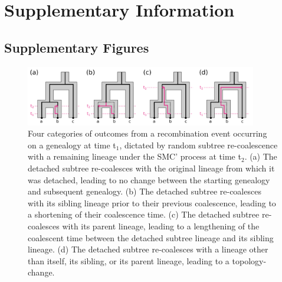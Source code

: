 \documentclass[11pt]{article}
\newcommand{\beginsupplement}{%
	\setcounter{table}{0}
	\setcounter{figure}{0}
	\renewcommand{\thetable}{S\arabic{table}}%
	\renewcommand{\thefigure}{S\arabic{figure}}%
}
\begin{document}
\newpage

\beginsupplement
\section{Supplementary Information}

\setcounter{equation}{0}
\renewcommand{\theequation}{S\arabic{equation}}

\subsection{Supplementary Figures}

\begin{figure}[p]
	\centering
	\includegraphics[width=0.9\textwidth]{figures/current/FigS1-recomb-types.pdf}
	\caption{
		Four categories of outcomes from a recombination event occurring on a
		genealogy at time t$_1$, dictated by random subtree re-coalescence with
		a remaining lineage under the SMC' process at time t$_2$. (a) The
		detached subtree re-coalesces with the original lineage from which it
		was detached, leading to no change between the starting genealogy and 
		subsequent genealogy. (b) The detached subtree re-coalesces with its
		sibling lineage prior to their previous coalescence, leading to a shortening
		of their coalescence time. (c) The detached subtree re-coalesces with
		its parent lineage, leading to a lengthening of the coalescent time 
		between the detached subtree lineage and its sibling lineage. (d) The
		detached subtree re-coalesces with a lineage other than itself, its sibling,
		or its parent lineage, leading to a topology-change. 
	}
     \label{fig:figS-recomb-types}
\end{figure}
\end{document}
